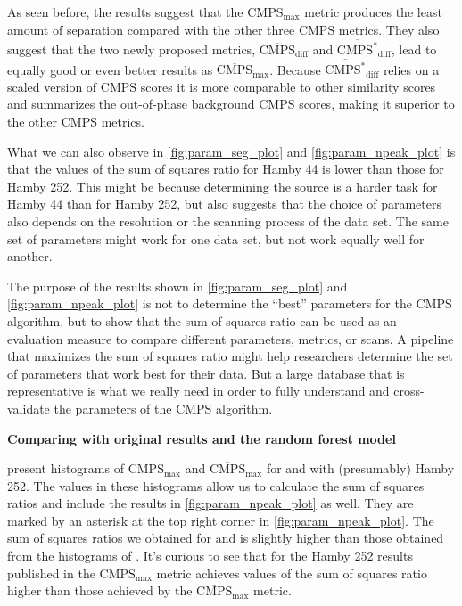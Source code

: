As seen before, the results suggest that the \(\mathrm{CMPS_{max}}\)
metric produces the least amount of separation compared with the other
three CMPS metrics. They also suggest that the two newly proposed
metrics, \(\mathrm{\overline{CMPS}_{diff}}\) and
\(\mathrm{\overline{CMPS^*}_{diff}}\), lead to equally good or even
better results as \(\mathrm{\overline{CMPS}_{max}}\). Because
\(\mathrm{\overline{CMPS^*}_{diff}}\) relies on a scaled version of CMPS
scores it is more comparable to other similarity scores and summarizes
the out-of-phase background CMPS scores, making it superior to the other
CMPS metrics.

What we can also observe in \autoref{fig:param_seg_plot} and
\autoref{fig:param_npeak_plot} is that the values of the sum of squares
ratio for Hamby 44 is lower than those for Hamby 252. This might be
because determining the source is a harder task for Hamby 44 than for
Hamby 252, but also suggests that the choice of parameters also depends
on the resolution or the scanning process of the data set. The same set
of parameters might work for one data set, but not work equally well for
another.

The purpose of the results shown in \autoref{fig:param_seg_plot} and
\autoref{fig:param_npeak_plot} is not to determine the ``best''
parameters for the CMPS algorithm, but to show that the sum of squares
ratio can be used as an evaluation measure to compare different
parameters, metrics, or scans. A pipeline that maximizes the sum of
squares ratio might help researchers determine the set of parameters
that work best for their data. But a large database that is
representative is what we really need in order to fully understand and
cross-validate the parameters of the CMPS algorithm.

\textbf{Comparing with original results and the random forest model}

\citet{cmps} present histograms of \(\mathrm{CMPS_{max}}\) and
\(\mathrm{\overline{CMPS}_{max}}\) for  and
 with (presumably) Hamby 252. The values in
these histograms allow us to calculate the sum of squares ratios and
include the results in \autoref{fig:param_npeak_plot} as well. They are
marked by an asterisk at the top right corner in
\autoref{fig:param_npeak_plot}. The sum of squares ratios we obtained
for  and  is slightly
higher than those obtained from the histograms of \citet{cmps}. It's
curious to see that for the Hamby 252 results published in \citet{cmps}
the \(\mathrm{{CMPS}_{max}}\) metric achieves values of the sum of
squares ratio higher than those achieved by the
\(\mathrm{\overline{CMPS}_{max}}\) metric.

